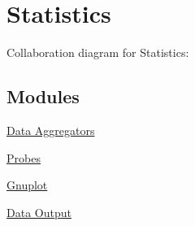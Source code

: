\hypertarget{group__stats}{}\section{Statistics}
\label{group__stats}
Collaboration diagram for Statistics\+:
\subsection*{Modules}
\begin{DoxyCompactItemize}
\item 
\hyperlink{group__aggregator}{Data Aggregators}
\item 
\hyperlink{group__probes}{Probes}
\item 
\hyperlink{group__gnuplot}{Gnuplot}
\item 
\hyperlink{group__dataoutput}{Data Output}
\end{DoxyCompactItemize}
